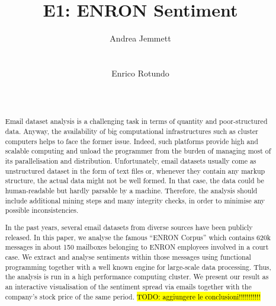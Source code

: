 \documentclass{vldb}
\newcommand{\hlc}[2][lightcyan]{{\sethlcolor{#1}\hl{#2}}}
\begin{document}
\title{E1: ENRON Sentiment}


\author{
\alignauthor
Andrea Jemmett\\
       \\
       \\
\alignauthor
Enrico Rotundo\\
       \\
       \\
}


\maketitle

\begin{abstract}
Email dataset analysis is a challenging task in terms of quantity and poor-structured data.
Anyway, the availability of big computational infrastructures such as cluster computers helps to face the former issue.
Indeed, such platforms provide high and scalable computing and unload the programmer from the burden of managing most of its parallelisation and distribution.
Unfortunately, email datasets usually come as unstructured dataset in the form of text files or, whenever they contain any markup structure, the actual data might not be well formed.
In that case, the data could be human-readable but hardly parsable by a machine.
Therefore, the analysis should include additional mining steps and many integrity checks, in order to minimise any possible inconsistencies.  

In the past years, several email datasets from diverse sources have been publicly released.
In this paper, we analyse the famous ``ENRON Corpus'' which contains 620k messages in about 150 mailboxes belonging to ENRON employees involved in a court case.
We extract and analyse sentiments within those messages using functional programming together with a well known engine for large-scale data processing. 
Thus, the analysis is run in a high performance computing cluster.   
We present our result as an interactive visualisation of the sentiment spread via emails together with the company's stock price of the same period.
\hlc{TODO: aggiungere le conclusioni!!!!!!!!!!!}

\end{abstract}
\end{document}
